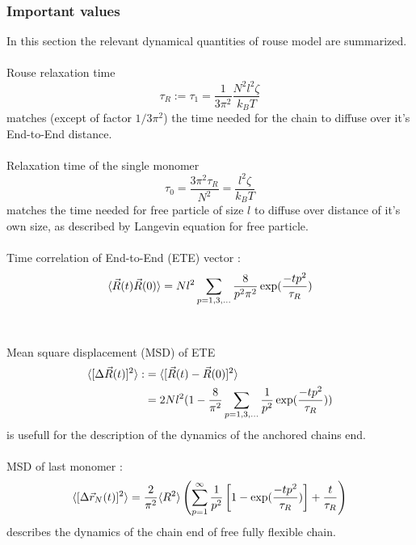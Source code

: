 \documentclass[
    paper=A4,pagesize=automedia,fontsize=12pt,
    BCOR=15mm,DIV=22,
    twoside,headinclude,footinclude=false,
    ngerman,fleqn,             %
    bibliography=totocnumbered,          %
    listof=totoc,                %
    listof=flat,                 %
    cleardoublepage=empty      %
    numbers=endperiod
]{scrartcl}
\begin{document}
\subsubsection{Important values}
In this section the relevant dynamical quantities of rouse model are summarized.
\\
\\
Rouse relaxation time
\begin{equation} \label{eq:rouse_relaxation_time}
    \tau_R := \tau_1 = \frac{1}{3 \pi^2} \frac{N^2 l^2 \zeta}{k_B T} 
\end{equation}
matches (except of factor $1/3\pi^2$) the time needed for the chain to diffuse over it's End-to-End distance.
\\
\\
Relaxation time of the single monomer
\begin{equation}
    \tau_0 = \frac{3 \pi^2 \tau_R}{N^2} = \frac{l^2 \zeta}{k_B T}
\end{equation}
matches the time needed for free particle of size $l$ to diffuse over distance
of it's own size, as described by Langevin equation for free particle.
\\
\\
Time correlation of End-to-End (ETE) vector \cite{Doi_Edwards_PD:1994}:
\begin{equation}
    \langle\vec{R}(t)\vec{R}(0)\rangle = Nl^2 \sum_{p=1,3,\ldots} \frac{8}{p^2\pi^2}\exp(\frac{-t p^2}{\tau_R})
\end{equation}
\\
\\
Mean square displacement (MSD) of ETE
\begin{equation} \label{eq:rouse_msd_ete}
    \begin{aligned}
        \langle[\Delta \vec{R}(t)]^2\rangle :&= \langle[\vec{R}(t)-\vec{R}(0)]^2\rangle \\
        & = 2 N l^2 (1 - \frac{8}{\pi^2}\sum_{p=1,3,\ldots}\frac{1}{p^2} \exp(\frac{-tp^2}{\tau_R}))
    \end{aligned}
\end{equation}
is usefull for the description of the dynamics of the anchored chains end.
\\
\\
MSD of last monomer \cite{svaneborg_2020}:
\begin{equation}
    \langle[\Delta \vec{r}_N(t)]^2\rangle = \frac{2}{\pi^2} \langle R^2\rangle \left( \sum_{p=1}^{\infty} \frac{1}{p^2} \left[ 1-\exp(\frac{-t p^2}{\tau_R}) \right] + \frac{t}{\tau_R} \right)
\end{equation}
describes the dynamics of the chain end of free fully flexible chain.
\end{document}
